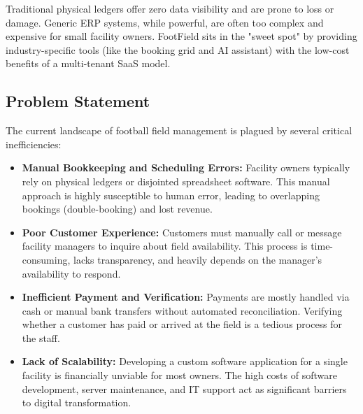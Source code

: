 Traditional physical ledgers offer zero data visibility and are prone to loss or damage. Generic ERP systems, while powerful, are often too complex and expensive for small facility owners. FootField sits in the "sweet spot" by providing industry-specific tools (like the booking grid and AI assistant) with the low-cost benefits of a multi-tenant SaaS model.

\subsection{Problem Statement}
The current landscape of football field management is plagued by several critical inefficiencies:
\begin{itemize}
    \item \textbf{Manual Bookkeeping and Scheduling Errors:} Facility owners typically rely on physical ledgers or disjointed spreadsheet software. This manual approach is highly susceptible to human error, leading to overlapping bookings (double-booking) and lost revenue.
    \item \textbf{Poor Customer Experience:} Customers must manually call or message facility managers to inquire about field availability. This process is time-consuming, lacks transparency, and heavily depends on the manager's availability to respond.
    \item \textbf{Inefficient Payment and Verification:} Payments are mostly handled via cash or manual bank transfers without automated reconciliation. Verifying whether a customer has paid or arrived at the field is a tedious process for the staff.
    \item \textbf{Lack of Scalability:} Developing a custom software application for a single facility is financially unviable for most owners. The high costs of software development, server maintenance, and IT support act as significant barriers to digital transformation.
\end{itemize}

